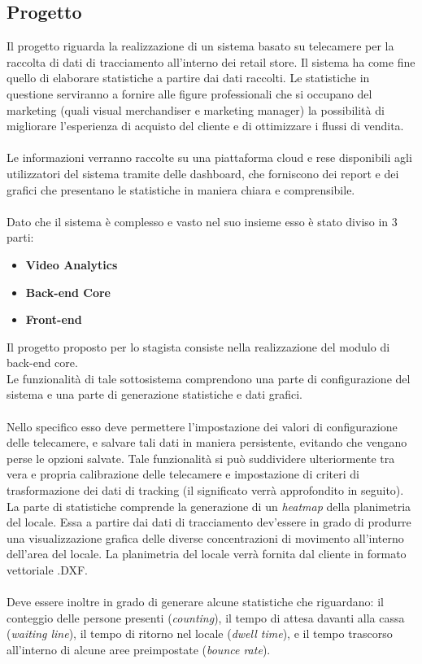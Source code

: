 \subsection{Progetto} \label{ssec:progetto}
Il progetto riguarda la realizzazione di un sistema basato su telecamere per la raccolta di dati di tracciamento all'interno dei retail store. Il sistema ha come fine quello di elaborare statistiche a partire dai dati raccolti. Le statistiche in questione serviranno a fornire alle figure professionali che si occupano del marketing (quali visual merchandiser e marketing manager) la possibilità di migliorare l'esperienza di acquisto del cliente e di ottimizzare i flussi di vendita.\\ \\
Le informazioni verranno raccolte su una piattaforma cloud e rese disponibili agli utilizzatori del sistema tramite delle dashboard, che forniscono dei report e dei grafici che presentano le statistiche in maniera chiara e comprensibile. \\ \\
Dato che il sistema è complesso e vasto nel suo insieme esso è stato diviso in 3 parti:
\begin{itemize}
	\item \textbf{Video Analytics}
	\item \textbf{Back-end Core}
	\item \textbf{Front-end}
\end{itemize}
Il progetto proposto per lo stagista consiste nella realizzazione del modulo di back-end core.\\
Le funzionalità di tale sottosistema comprendono una parte di configurazione del sistema e una parte di generazione statistiche e dati grafici. \\ \\
Nello specifico esso deve permettere l'impostazione dei valori di configurazione delle telecamere, e salvare tali dati in maniera persistente, evitando che vengano perse le opzioni salvate. Tale funzionalità si può suddividere ulteriormente tra vera e propria calibrazione delle telecamere e impostazione di criteri di trasformazione dei dati di tracking (il significato verrà approfondito in seguito). \\
La parte di statistiche comprende la generazione di un \textit{heatmap} della planimetria del locale. Essa a partire dai dati di tracciamento dev'essere in grado di produrre una visualizzazione grafica delle diverse concentrazioni di movimento all'interno dell'area del locale. La planimetria del locale verrà fornita dal cliente in formato vettoriale .DXF. \\ \\Deve essere inoltre in grado di generare alcune statistiche che riguardano: il conteggio delle persone presenti (\textit{counting}), il tempo di attesa davanti alla cassa (\textit{waiting line}), il tempo di ritorno nel locale (\textit{dwell time}), e il tempo trascorso all'interno di alcune aree preimpostate (\textit{bounce rate}).\\

